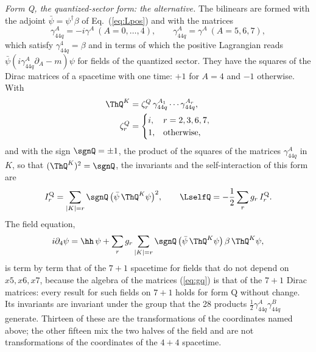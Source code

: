 \emph{Form Q, the quantized-sector form: the alternative.} The bilinears are formed with the adjoint
$\bar\psi=\psi^\dagger\beta$ of Eq.~(\ref{eq:Lpos}) and with the matrices
\begin{equation}
\gamma_{44q}^{A}=-i\gamma^{A}\ (A=0,\dots,4),\qquad\gamma_{44q}^{A}=\gamma^{A}\ (A=5,6,7),
\label{eq:gq}
\end{equation}
which satisfy $\gamma_{44q}^{4}=\beta$ and in terms of which the positive Lagrangian reads
$\bar\psi(i\gamma_{44q}^{A}\partial_A-m)\psi$ for fields of the quantized sector. They have the
squares of the Dirac matrices of a spacetime with one time: $+1$ for $A=4$ and $-1$ otherwise. With
\begin{equation}
\begin{aligned}
\ThQ^{K}&=\zeta_r^{Q}\,\gamma_{44q}^{A_1}\cdots\gamma_{44q}^{A_r},\\
\zeta_r^{Q}&=\begin{cases}i,&r=2,3,6,7,\\1,&\text{otherwise},\end{cases}
\end{aligned}
\label{eq:ThetaQ}
\end{equation}
and with the sign $\sgnQ=\pm1$, the product of the squares of the matrices $\gamma_{44q}^{A}$ in $K$,
so that $(\ThQ^{K})^{2}=\sgnQ$, the invariants and the self-interaction of this form are
\begin{equation}
I_r^{\mathrm Q}=\sum_{|K|=r}\sgnQ\,\big(\bar\psi\,\ThQ^{K}\psi\big)^{2},\qquad\LselfQ=-\frac12\sum_rg_r\,I_r^{\mathrm Q} .
\label{eq:LselfQ}
\end{equation}
The field equation,
\begin{equation}
i\partial_4\psi=\hh\,\psi+\sum_rg_r\sum_{|K|=r}\sgnQ\,\big(\bar\psi\,\ThQ^{K}\psi\big)\,\beta\,\ThQ^{K}\psi ,
\label{eq:fieldQ}
\end{equation}
is term by term that of the $7+1$ spacetime for fields that do not depend on $x5,x6,x7$, because the
algebra of the matrices (\ref{eq:gq}) is that of the $7+1$ Dirac matrices: every result for such
fields on $7+1$ holds for form Q without change. Its invariants are invariant under the group that
the 28 products $\tfrac12\gamma_{44q}^{A}\gamma_{44q}^{B}$ generate. Thirteen of these are the
transformations of the coordinates named above; the other fifteen mix the two halves of the field
and are not transformations of the coordinates of the $4+4$ spacetime.


